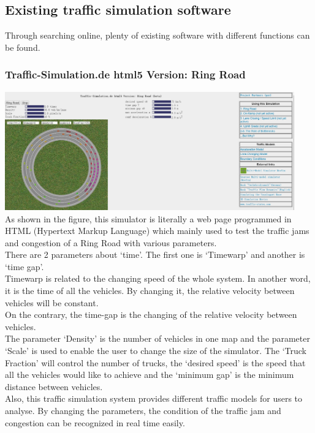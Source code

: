\documentclass[a4paper,12pt]{article}
\begin{document}
\subsection{Existing traffic simulation software}
Through searching online, plenty of existing software with different functions can be found.\\
\subsubsection{Traffic-Simulation.de html5 Version: Ring Road}
\includegraphics[width=12.5cm]{RingRoad.eps}\\
As shown in the figure, this simulator is literally a web page programmed in HTML (Hypertext Markup Language) which mainly used to test the traffic jams and congestion of a Ring Road with various parameters.\\
There are 2 parameters about ‘time’. The first one is ‘Timewarp’ and another is ‘time gap’.\\
Timewarp is related to the changing speed of the whole system. In another word, it is the time of all the vehicles. By changing it, the relative velocity between vehicles will be constant.\\
On the contrary, the time-gap is the changing of the relative velocity between vehicles.\\
The parameter ‘Density’ is the number of vehicles in one map and the parameter ‘Scale’ is used to enable the user to change the size of the simulator. The ‘Truck Fraction’ will control the number of trucks, the ‘desired speed’ is the speed that all the vehicles would like to achieve and the ‘minimum gap’ is the minimum distance between vehicles.\\
Also, this traffic simulation system provides different traffic models for users to analyse. By changing the parameters, the condition of the traffic jam and congestion can be recognized in real time easily.\\
\end{document}

